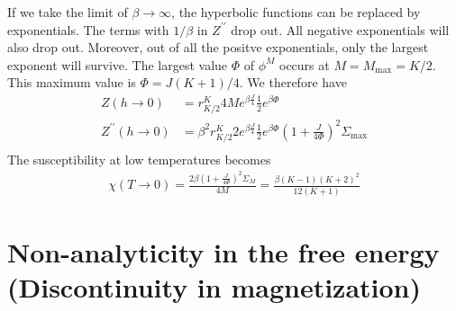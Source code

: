 \documentclass[12pt]{revtex4-2}
\begin{document}
If we take the limit of \(\beta \to \infty\), the hyperbolic functions can be replaced by exponentials. The terms with \(1/\beta\) in \(Z^{\prime\prime}\) drop out. All negative exponentials will also drop out. Moreover, out of all the positve exponentials, only the largest exponent will survive. The largest value \(\Phi\) of \(\phi^M\) occurs at \(M = M_\text{max} = K/2\). This maximum value is \(\Phi = J(K+1)/4\). We therefore have
\begin{align}
	     Z(h \to 0) &= r^K_{K/2} 4Me^{\beta \frac{J}{4}}\frac{1}{2}e^{\beta\Phi}\\
	     Z^{\prime\prime}(h \to 0) &=\beta^2 r^K_{K/2}2 e^{\beta \frac{J}{4}}\frac{1}{2}e^{\beta \Phi}\left(1 + \frac{J}{4\Phi}\right)^2\Sigma_\text{max}\\
\end{align}
The susceptibility at low temperatures becomes
\begin{align}
	\chi(T \to 0) = \frac{2\beta\left(1 + \frac{J}{4\Phi}\right)^2\Sigma_M}{4M} = \frac{\beta (K-1)(K+2)^2}{12(K+1)}
\end{align}

\section{Non-analyticity in the free energy (Discontinuity in magnetization)}
\end{document}
